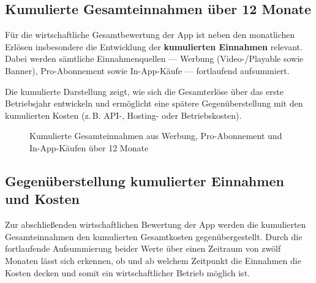 \subsection{Kumulierte Gesamteinnahmen über 12 Monate}

Für die wirtschaftliche Gesamtbewertung der App ist neben den monatlichen Erlösen insbesondere die Entwicklung der \textbf{kumulierten Einnahmen} relevant. Dabei werden sämtliche Einnahmenquellen --- Werbung (Video-/Playable sowie Banner), Pro-Abonnement sowie In-App-Käufe --- fortlaufend aufsummiert. 

Die kumulierte Darstellung zeigt, wie sich die Gesamterlöse über das erste Betriebsjahr entwickeln und ermöglicht eine spätere Gegenüberstellung mit den kumulierten Kosten (z.\,B. API-, Hosting- oder Betriebskosten).

\begin{figure}[H]
\centering
{}
\caption{Kumulierte Gesamteinnahmen aus Werbung, Pro-Abonnement und In-App-Käufen über 12 Monate}
\end{figure}
\subsection{Gegenüberstellung kumulierter Einnahmen und Kosten}

Zur abschließenden wirtschaftlichen Bewertung der App werden die kumulierten Gesamteinnahmen den kumulierten Gesamtkosten gegenübergestellt. 
Durch die fortlaufende Aufsummierung beider Werte über einen Zeitraum von zwölf Monaten lässt sich erkennen, ob und ab welchem Zeitpunkt die Einnahmen die Kosten decken und somit ein wirtschaftlicher Betrieb möglich ist.

